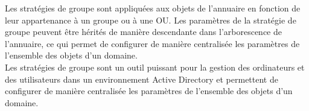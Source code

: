 \documentclass[12pt, a4paper]{article}
\begin{document}
Les stratégies de groupe sont appliquées aux objets de l'annuaire en fonction 
de leur appartenance à un groupe ou à une OU. Les paramètres de la stratégie de 
groupe peuvent être hérités de manière descendante dans l'arborescence de 
l'annuaire, ce qui permet de configurer de manière centralisée les paramètres de 
l'ensemble des objets d'un domaine.\\

Les stratégies de groupe sont un outil puissant pour la gestion des 
ordinateurs et des utilisateurs dans un environnement Active Directory et 
permettent de configurer de manière centralisée les paramètres de l'ensemble 
des objets d'un domaine.
\end{document}
